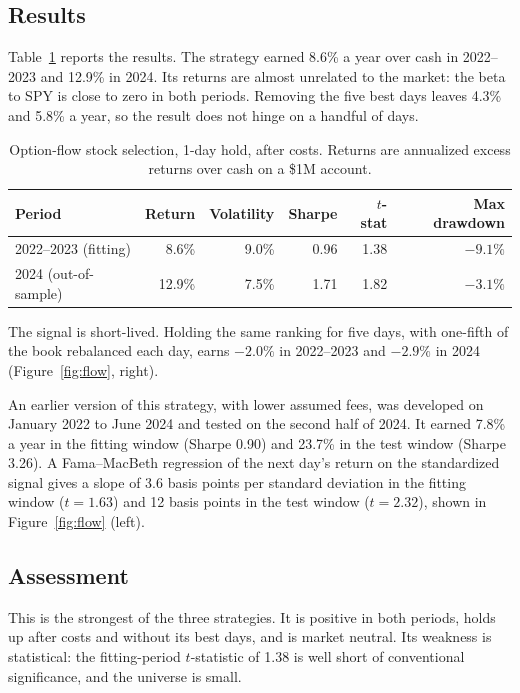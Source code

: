\documentclass[../main.tex]{subfiles}
\begin{document}
\subsection{Results}
Table~\ref{tab:flow} reports the results. The strategy earned 8.6\% a year over cash in 2022--2023 and 12.9\% in 2024. Its returns are almost unrelated to the market: the beta to SPY is close to zero in both periods. Removing the five best days leaves 4.3\% and 5.8\% a year, so the result does not hinge on a handful of days.

\begin{table}[ht]\centering\small
\caption{Option-flow stock selection, 1-day hold, after costs. Returns are annualized excess returns over cash on a \$1M account.}\label{tab:flow}
\begin{tabular}{lrrrrr}
\toprule
Period & Return & Volatility & Sharpe & $t$-stat & Max drawdown \\
\midrule
2022--2023 (fitting) & 8.6\% & 9.0\% & 0.96 & 1.38 & $-9.1\%$ \\
2024 (out-of-sample) & 12.9\% & 7.5\% & 1.71 & 1.82 & $-3.1\%$ \\
\bottomrule
\end{tabular}
\end{table}

The signal is short-lived. Holding the same ranking for five days, with one-fifth of the book rebalanced each day, earns $-2.0\%$ in 2022--2023 and $-2.9\%$ in 2024 (Figure~\ref{fig:flow}, right).

An earlier version of this strategy, with lower assumed fees, was developed on January 2022 to June 2024 and tested on the second half of 2024. It earned 7.8\% a year in the fitting window (Sharpe 0.90) and 23.7\% in the test window (Sharpe 3.26). A Fama--MacBeth regression \citep{famamacbeth1973} of the next day's return on the standardized signal gives a slope of 3.6 basis points per standard deviation in the fitting window ($t = 1.63$) and 12 basis points in the test window ($t = 2.32$), shown in Figure~\ref{fig:flow} (left).


\subsection{Assessment}
This is the strongest of the three strategies. It is positive in both periods, holds up after costs and without its best days, and is market neutral. Its weakness is statistical: the fitting-period $t$-statistic of 1.38 is well short of conventional significance, and the universe is small.

\ifSubfilesClassLoaded{}{}
\end{document}
